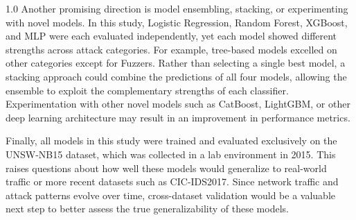 \begin{spacing}{1.0}
Another promising direction is model ensembling, stacking, or experimenting with novel models. In this study, Logistic Regression, Random Forest, XGBoost, and MLP were
each evaluated independently, yet each model showed different strengths across attack categories. For example, tree-based models excelled on other categories except for Fuzzers. Rather than selecting a single best model,
a stacking approach could combine the predictions of all four models, allowing the ensemble to exploit the 
complementary strengths of each classifier. Experimentation with other novel models such as CatBoost, LightGBM, or other deep learning architecture 
may result in an improvement in performance metrics.

Finally, all models in this study were trained and evaluated exclusively on the UNSW-NB15 dataset, which was collected in a
lab environment in 2015. This raises questions about how well these models would generalize to real-world traffic or more recent datasets
such as CIC-IDS2017. Since network traffic and attack patterns evolve over time, cross-dataset validation would be a valuable next step 
to better assess the true generalizability of these models.

\end{spacing}
\newpage

